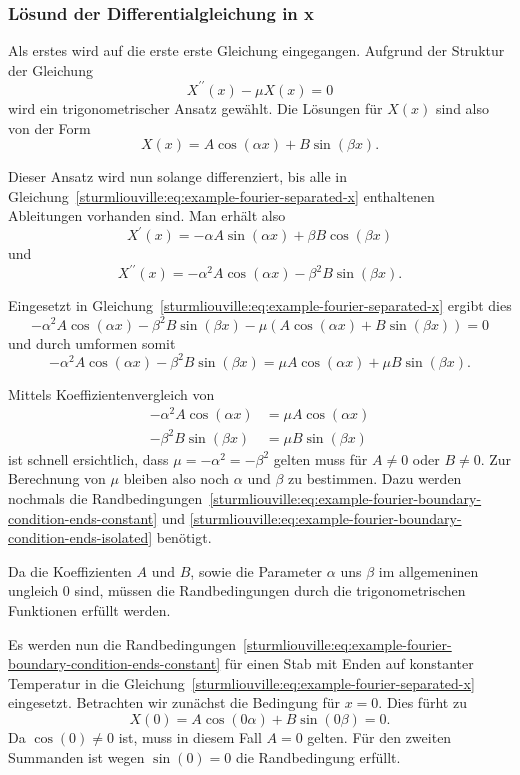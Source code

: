 %
%

\subsubsection{Lösund der Differentialgleichung in x}
Als erstes wird auf die erste erste Gleichung eingegangen.
Aufgrund der Struktur der Gleichung
\[
    X^{\prime \prime}(x) - \mu X(x)
    =
    0
\]
wird ein trigonometrischer Ansatz gewählt.
Die Lösungen für $X(x)$ sind also von der Form
\[
    X(x)
    =
    A \cos \left( \alpha x\right) + B \sin \left( \beta x\right).
\]

Dieser Ansatz wird nun solange differenziert, bis alle in
Gleichung~\eqref{sturmliouville:eq:example-fourier-separated-x} enthaltenen
Ableitungen vorhanden sind.
Man erhält also
\[
    X^{\prime}(x)
    =
    - \alpha A \sin \left( \alpha x \right) +
    \beta B \cos \left( \beta x \right)
\]
und
\[
    X^{\prime \prime}(x)
    =
    -\alpha^{2} A \cos \left( \alpha x \right) -
    \beta^{2} B \sin \left( \beta x \right).
\]

Eingesetzt in Gleichung~\eqref{sturmliouville:eq:example-fourier-separated-x}
ergibt dies
\[
    -\alpha^{2}A\cos(\alpha x) - \beta^{2}B\sin(\beta x) -
    \mu\left(A\cos(\alpha x) + B\sin(\beta x)\right)
    =
    0
\]
und durch umformen somit
\[
    -\alpha^{2}A\cos(\alpha x) - \beta^{2}B\sin(\beta x)
    =
    \mu A\cos(\alpha x) + \mu B\sin(\beta x).
\]

Mittels Koeffizientenvergleich von
\[
\begin{aligned}
    -\alpha^{2}A\cos(\alpha x)
    &=
    \mu A\cos(\alpha x)
    \\
    -\beta^{2}B\sin(\beta x)
    &=
    \mu B\sin(\beta x)
\end{aligned}
\]
ist schnell ersichtlich, dass $ \mu = -\alpha^{2} = -\beta^{2} $ gelten muss für
$ A \neq 0 $ oder $ B \neq 0 $.
Zur Berechnung von $ \mu $ bleiben also noch  $ \alpha $ und $ \beta $ zu
bestimmen.
Dazu werden nochmals die
Randbedingungen~\eqref{sturmliouville:eq:example-fourier-boundary-condition-ends-constant} 
und \eqref{sturmliouville:eq:example-fourier-boundary-condition-ends-isolated}
benötigt.

Da die Koeffizienten $A$ und $B$, sowie die Parameter $\alpha$ uns $\beta$ im
allgemeninen ungleich $0$ sind, müssen die Randbedingungen durch die
trigonometrischen Funktionen erfüllt werden.

Es werden nun die 
Randbedingungen~\eqref{sturmliouville:eq:example-fourier-boundary-condition-ends-constant}
für einen Stab mit Enden auf konstanter Temperatur in die
Gleichung~\eqref{sturmliouville:eq:example-fourier-separated-x} eingesetzt.
Betrachten wir zunächst die Bedingung für $x = 0$.
Dies fürht zu
\[
    X(0)
    =
    A \cos(0 \alpha) + B \sin(0 \beta)
    =
    0.
\]
Da $\cos(0) \neq 0$ ist, muss in diesem Fall $A = 0$ gelten.
Für den zweiten Summanden ist wegen $\sin(0) = 0$ die Randbedingung erfüllt.

